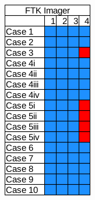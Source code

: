 \begin{figure}[h]
\begin{subfigure}{0.17\linewidth}
    \end{subfigure}~~
    \begin{subfigure}{0.17\linewidth}
        \includegraphics[width=\linewidth]{fig/ftk_results_fat.png}

\end{subfigure}
\end{figure}
